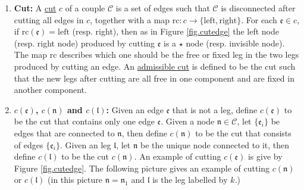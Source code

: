 \begin{defn}
\begin{enumerate}
        \item \textbf{Cut:} A \underline{cut} $c$ of a couple $\mathcal{C}$ is a set of edges such that $\mathcal{C}$ is disconnected after cutting all edges in $c$, together with a map $\text{rc}:c\rightarrow \{\text{left}, \text{right}\}$. For each $\mathfrak{e}\in c$, if $\text{rc}(\mathfrak{e})=\text{left}$ (resp. right), then as in Figure \ref{fig.cutedge} the left node (resp. right node) produced by cutting $\mathfrak{e}$ is a $\star$ node (resp. invisible node). The map $\text{rc}$ describes which one should be the free or fixed leg in the two legs produced by cutting an edge. An \underline{admissible cut} is defined to be the cut such that the new legs after cutting are all free in one component and are fixed in another component. 
        \item \textbf{$c(\mathfrak{e})$, $c(\mathfrak{n})$ and $c(\mathfrak{l})$:} Given an edge $\mathfrak{e}$ that is not a leg, define  $c(\mathfrak{e})$ to be the cut that contains only one edge $\mathfrak{e}$. Given a node $\mathfrak{n}\in \mathcal{C}$, let $\{\mathfrak{e}_{i}\}$ be edges that are connected to $\mathfrak{n}$, then define $c(\mathfrak{n})$ to be the cut that consists of edges $\{\mathfrak{e}_{i}\}$. Given an leg $\mathfrak{l}$, let $\mathfrak{n}$ be the unique node connected to it, then define  $c(\mathfrak{l})$ to be the cut $c(\mathfrak{n})$. An example of cutting $c(\mathfrak{e})$ is give by Figure \ref{fig.cutedge}. The following picture gives an example of cutting $c(\mathfrak{n})$ or $c(\mathfrak{l})$ (in this picture $\mathfrak{n}=\mathfrak{n}_1$ and $\mathfrak{l}$ is the leg labelled by $k$.)
        
        \begin{figure}[H]
        \centering
\end{figure}
\end{enumerate}
\end{defn}
